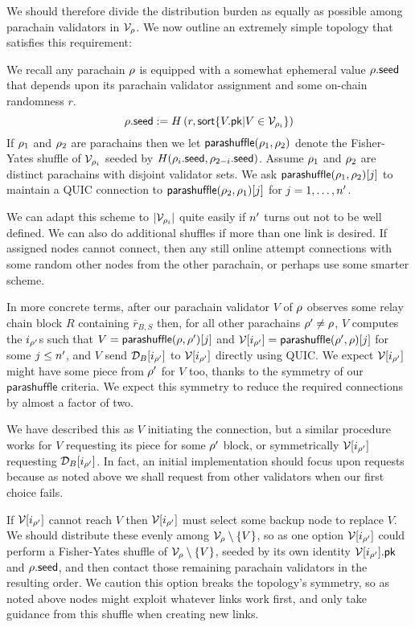 We should therefore divide the distribution burden as equally as possible among parachain validators in $\mathcal{V}_{\rho}$.  We now outline an extremely simple topology that satisfies this requirement:

We recall any parachain $\rho$ is equipped with a somewhat ephemeral value $\rho.\mathsf{seed}$ that depends upon its parachain validator assignment and some on-chain randomness $r$.
$$ \rho.\mathsf{seed} := H\left( r, \mathsf{sort} \{  V.\mathsf{pk}  |  V \in \mathcal{V}_{\rho_i}  \} \right) $$
If $\rho_1$ and $\rho_2$ are parachains then we let $\mathsf{parashuffle}(\rho_1,\rho_2)$ denote the Fisher-Yates shuffle of $\mathcal{V}_{\rho_i}$ seeded by $H( \rho_i.\mathsf{seed}, \rho_{2-i}.\mathsf{seed} )$.  Assume $\rho_1$ and $\rho_2$ are distinct parachains with disjoint validator sets.  We ask $\mathsf{parashuffle}(\rho_1,\rho_2)[j]$ to maintain a QUIC connection to $\mathsf{parashuffle}(\rho_2,\rho_1)[j]$ for $j = 1,\ldots,n'$.  

We can adapt this scheme to $|\mathcal{V}_{\rho_i}|$ quite easily if $n'$ turns out not to be well defined.  We can also do additional shuffles if more than one link is desired.  If assigned nodes cannot connect, then any still online attempt connections with some random other nodes from the other parachain, or perhaps use some smarter scheme. 

In more concrete terms, after our parachain validator $V$ of $\rho$ observes some relay chain block $R$ containing $\bar{r}_{B,S}$ then, for all other parachains $\rho' \ne \rho$, $V$ computes the $i_{\rho'}$s such that $V = \mathsf{parashuffle}(\rho,\rho')[j]$ and $\mathcal{V}[i_{\rho'}] = \mathsf{parashuffle}(\rho',\rho)[j]$ for some $j \leq n'$, and $V$ send $\mathcal{D}_B[i_{\rho'}]$ to $\mathcal{V}[i_{\rho'}]$ directly using QUIC.  We expect $\mathcal{V}[i_{\rho'}]$ might have some piece from $\rho'$ for $V$ too, thanks to the symmetry of our $\mathsf{parashuffle}$ criteria.  We expect this symmetry to reduce the required connections by almost a factor of two.

We have described this as $V$ initiating the connection, but a similar procedure works for $V$ requesting its piece for some $\rho'$ block, or symmetrically $\mathcal{V}[i_{\rho'}]$ requesting $\mathcal{D}_B[i_{\rho'}]$.  In fact, an initial implementation should focus upon requests because as noted above we shall request from other validators when our first choice fails. 

If $\mathcal{V}[i_{\rho'}]$ cannot reach $V$ then $\mathcal{V}[i_{\rho'}]$ must select some backup node to replace $V$.  We should distribute these evenly among $\mathcal{V}_{\rho} \setminus \{V\}$, so as one option $\mathcal{V}[i_{\rho'}]$ could perform a Fisher-Yates shuffle of $\mathcal{V}_{\rho} \setminus \{V\}$, seeded by its own identity $\mathcal{V}[i_{\rho'}].\mathsf{pk}$ and $\rho.\mathsf{seed}$, and then contact those remaining parachain validators in the resulting order.  We caution this option breaks the topology's symmetry, so as noted above nodes might exploit whatever links work first, and only take guidance from this shuffle when creating new links.  

